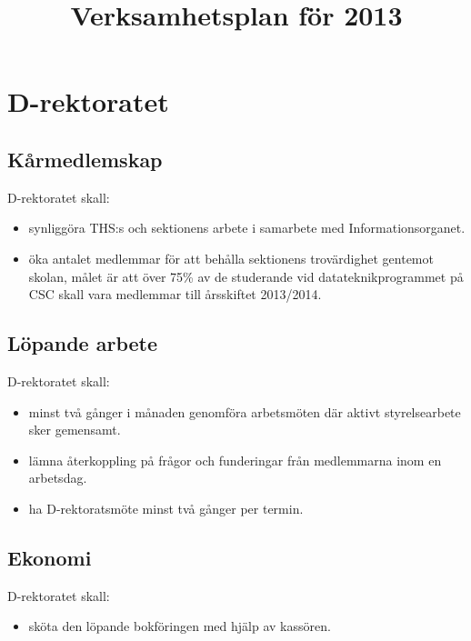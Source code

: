 \documentclass[a4paper]{article}
\title{Verksamhetsplan för 2013}
\date{}
\begin{document}
\maketitle

\pagestyle{empty}
\thispagestyle{empty}

\section{D-rektoratet}

\subsection{Kårmedlemskap}
D-rektoratet skall:
\begin{itemize}
\item synliggöra THS:s och sektionens arbete i samarbete med Informationsorganet.
\item öka antalet medlemmar för att behålla sektionens trovärdighet gentemot skolan, målet är att över 75\% av de studerande vid datateknikprogrammet på CSC skall vara medlemmar till årsskiftet 2013/2014.
\end{itemize}

\subsection{Löpande arbete}
D-rektoratet skall:
\begin{itemize} 
\item minst två gånger i månaden genomföra arbetsmöten där aktivt styrelsearbete sker gemensamt.
\item lämna återkoppling på frågor och funderingar från medlemmarna inom en arbetsdag.
\item ha D-rektoratsmöte minst två gånger per termin.
\end{itemize}

\subsection{Ekonomi}
D-rektoratet skall:
\begin{itemize}
\item sköta den löpande bokföringen med hjälp av kassören.
\end{itemize}
\end{document}
